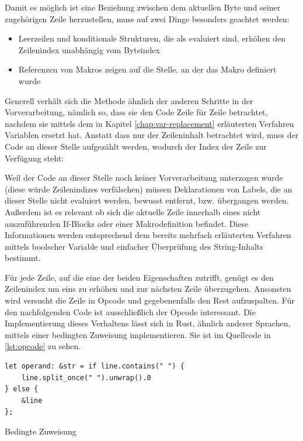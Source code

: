 Damit es möglich ist eine Beziehung zwischen dem aktuellen Byte und seiner zugehörigen Zeile herzustellen, muss auf zwei Dinge besonders geachtet werden:

\begin{itemize}
	\item Leerzeilen und konditionale Strukturen, die als  evaluiert sind, erhöhen den Zeilenindex unabhängig vom Byteindex
	\item Referenzen von Makros zeigen auf die Stelle, an der das Makro definiert wurde
\end{itemize}

Generell verhält sich die Methode ähnlich der anderen Schritte in der Vorverarbeitung, nämlich so, dass sie den Code Zeile für Zeile betrachtet, nachdem sie mittels dem in Kapitel \ref{chap:var-replacement} erläuterten Verfahren Variablen ersetzt hat. Anstatt dass nur der Zeileninhalt betrachtet wird, muss der Code an dieser Stelle aufgezählt werden, wodurch der Index der Zeile zur Verfügung steht:


Weil der Code an dieser Stelle noch keiner Vorverarbeitung unterzogen wurde (diese würde Zeilenindizes verfälschen) müssen Deklarationen von Labels, die an dieser Stelle nicht evaluiert werden, bewusst entfernt, bzw. übergangen werden. Außerdem ist es relevant ob sich die aktuelle Zeile innerhalb eines nicht auszuführenden If-Blocks oder einer Makrodefinition befindet. Diese Informationen werden entsprechend dem bereits mehrfach erläuterten Verfahren mittels boolscher Variable und einfacher Überprüfung des String-Inhalts bestimmt.

Für jede Zeile, auf die eine der beiden Eigenschaften zutrifft, genügt es den Zeilenindex um eins zu erhöhen und zur nächsten Zeile überzugehen. Ansonsten wird versucht die Zeile in Opcode und gegebenenfalls den Rest aufzuspalten. Für den nachfolgenden Code ist ausschließlich der Opcode interessant. Die Implementierung dieses Verhaltens lässt sich in Rust, ähnlich anderer Sprachen, mittels einer bedingten Zuweisung implementieren. Sie ist im Quellcode in \ref{lst:opcode} zu sehen.

\begin{listing}[th]
\begin{verbatim}
let operand: &str = if line.contains(" ") {
    line.split_once(" ").unwrap().0
} else {
    &line
};
\end{verbatim}
\label{lst:opcode}
\caption{Bedingte Zuweisung}
\end{listing}

